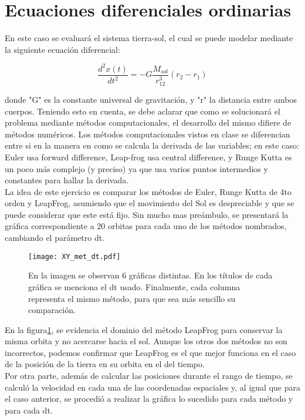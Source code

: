 \documentclass{article}
\begin{document}
\section{Ecuaciones diferenciales ordinarias}
En este caso se evaluará el sistema tierra-sol, el cual se puede modelar mediante la siguiente ecuación diferencial: 

\begin{equation}
    \frac{d^{2}x(t)}{dt^{2}} = -G\frac{M_{sol}}{r_{12}^{3}}(r_{2}-r_{1})
\end{equation}

donde "G" es la constante universal de gravitación, y "r" la distancia entre ambos cuerpos. Teniendo esto en cuenta, se debe aclarar que como se solucionará el problema mediante métodos computacionales, el desarrollo del mismo difiere de métodos numéricos. Los métodos computacionales vistos en clase se diferencian entre si en la manera en como se calcula la derivada de las variables; en este caso: Euler usa forward difference, Leap-frog usa central difference, y Runge Kutta es un poco más complejo (y preciso) ya que usa varios puntos intermedios y constantes para hallar la derivada.\\

La idea de este ejercicio es comparar los métodos de Euler, Runge Kutta de 4to orden y LeapFrog, asumiendo que el movimiento del Sol es despreciable y que se puede considerar que este está fijo. Sin mucho mas preámbulo, se presentará la gráfica correspondiente a 20 orbitas para cada uno de los métodos nombrados, cambiando el parámetro dt. 


\begin{figure}[H]
    \centering
    \texttt{[image: XY\_met\_dt.pdf]}
    \caption{En la imagen se observan 6 gráficas distintas. En los títulos de cada gráfica se menciona el dt usado. Finalmente, cada columna representa el mismo método, para que sea más sencillo su comparación.}
    \label{fig:pos}
\end{figure}

En la figura\ref{fig:pos}, se evidencia el dominio del método LeapFrog para conservar la misma orbita y no acercarse hacia el sol. Aunque los otros dos métodos no son incorrectos, podemos confirmar que LeapFrog es el que mejor funciona en el caso de la posición de la tierra en su orbita en el del tiempo.\\   

Por otra parte, además de calcular las posiciones durante el rango de tiempo, se calculó la velocidad en cada una de las coordenadas espaciales y, al igual que para el caso anterior, se procedió a realizar la gráfica lo sucedido para cada método y para cada dt.  
\end{document}
